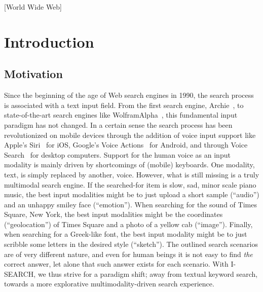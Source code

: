 \documentclass{acm_proc_article-sp}
\let\oldemph\emph
\renewcommand{\emph}[1]{\oldemph{\fontsize{9}{9}\selectfont #1}}
\newcommand{\inlinelistingsize}{\fontsize{8pt}{11pt}}
\let\oldurl\url
\renewcommand{\url}[1]{\inlinelistingsize\oldurl{#1}}
\begin{document}
[World Wide Web]


\section{Introduction}
\subsection{Motivation}
Since the beginning of the age of Web search engines in 1990, the search process is associated with a text input field.
From the first search engine, Archie~\cite{archie}, to state-of-the-art search engines like WolframAlpha~\cite{wolframalpha}, this fundamental input paradigm has not changed.
In a certain sense the search process has been revolutionized on mobile devices through the addition of voice input support like Apple's Siri~\cite{siri} for iOS, Google's Voice Actions~\cite{voiceactions} for Android, and through Voice Search~\cite{voicesearch} for desktop computers.
Support for the human voice as an input modality is mainly driven by shortcomings of (mobile) keyboards.
One modality, text, is simply replaced by another, voice.
However, what is still missing is a truly multimodal search engine.
If the searched-for item is slow, sad, minor scale piano music,
the best input modalities might be to just upload a short sample (``audio'') and an unhappy smiley face (``emotion'').
When searching for the sound of Times Square, New York,
the best input modalities might be the coordinates (``geolocation'') of Times Square and a photo of a yellow cab (``image'').
Finally, when searching for a Greek-like font,
the best input modality might be to just scribble some letters in the desired style (``sketch'').
The outlined search scenarios are of very different nature, and even for human beings it is not easy to find \emph{the} correct answer, let alone that such answer exists for each scenario.
With \mbox{I-SEARCH}, we thus strive for a paradigm shift; away from textual keyword search, towards a more explorative multimodality-driven search experience.
\end{document}
